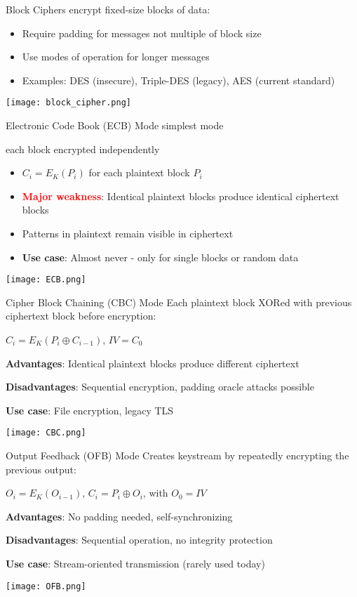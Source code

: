 \begin{concept}{Block Ciphers}
    encrypt fixed-size blocks of data:
    \begin{itemize}
        \item Require padding for messages not multiple of block size
        \item Use modes of operation for longer messages
        \item Examples: DES (insecure), Triple-DES (legacy), AES (current standard)
    \end{itemize}
    \texttt{[image: block\_cipher.png]}
\end{concept}





\begin{definition}{Electronic Code Book (ECB) Mode} simplest mode

    each block encrypted independently
\begin{itemize}
    \item \normalsize $C_i = E_K(P_i)$ for each plaintext block $P_i$ \small
    \item \textcolor{red}{\textbf{Major weakness}}: Identical plaintext blocks produce identical ciphertext blocks
    \item Patterns in plaintext remain visible in ciphertext
    \item \textbf{Use case}: Almost never - only for single blocks or random data
\end{itemize}
\texttt{[image: ECB.png]}
\end{definition}

\begin{definition}{Cipher Block Chaining (CBC) Mode}
Each plaintext block XORed with previous ciphertext block before encryption:

\normalsize $C_i = E_K(P_i \oplus C_{i-1})$, $IV = C_0$ \small

\textbf{Advantages}: Identical plaintext blocks produce different ciphertext

\textbf{Disadvantages}: Sequential encryption, padding oracle attacks possible

\textbf{Use case}: File encryption, legacy TLS 

\texttt{[image: CBC.png]}
\end{definition}



\begin{definition}{Output Feedback (OFB) Mode}
Creates keystream by repeatedly encrypting the previous output:

\normalsize $O_i = E_K(O_{i-1})$, $C_i = P_i \oplus O_i$, with $O_0 = IV$ \small

\textbf{Advantages}: No padding needed, self-synchronizing

\textbf{Disadvantages}: Sequential operation, no integrity protection

\textbf{Use case}: Stream-oriented transmission (rarely used today)

\texttt{[image: OFB.png]}
\end{definition}

